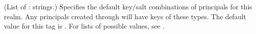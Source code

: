 \documentclass[letterpaper,10pt,english]{sphinxmanual}
\begin{document}
\begin{description}
\sphinxAtStartPar
(List of : strings.)  Specifies the default key/salt
combinations of principals for this realm.  Any principals created
through {\hyperref[\detokenize{admin/admin_commands/kadmin_local:kadmin-1}]{}} will have keys of these types.  The
default value for this tag is .  For lists of
possible values, see {\hyperref[\detokenize{admin/conf_files/kdc_conf:keysalt-lists}]{}}.

\end{description}
\end{document}
